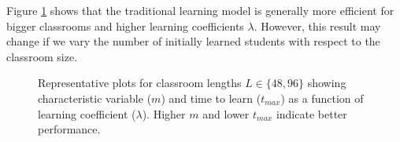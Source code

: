 \documentclass[10pt,a4paper,twoside]{article}
\begin{document}
Figure \ref{fig:TTL and m vs lambda} shows that the traditional learning model is generally more efficient for bigger classrooms and higher learning coefficients $\lambda$. However, this result may change if we vary the number of initially learned students with respect to the classroom size.
\begin{figure}[htbp!]
  \centering
  \quad %
  \quad %

  \quad %
  \caption{Representative plots for classroom lengths $L \in \lbrace 48,96 \rbrace$ showing characteristic variable ($m$) and time to learn ($t_{max}$) as a function of learning coefficient ($\lambda$). Higher $m$ and lower $t_{max}$ indicate better performance.
  }
  \label{fig:TTL and m vs lambda}
\end{figure}
\end{document}
